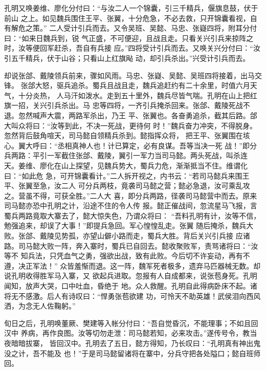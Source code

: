 孔明又唤姜维、廖化分付曰：“与汝二人一个锦囊，引三千精兵，偃旗息鼓，伏于前山
之上。如见魏兵围住王平、张翼，十分危急，不必去救，只开锦囊看视，自有解危之策。”
二人受计引兵而去。又令吴班、吴懿、马忠、张嶷四将，附耳分付曰：“如来日魏兵到，锐
气正盛，不可便迎，且战且走。只看关兴引兵来掠阵之时，汝等便回军赶杀，吾自有兵接
应。”四将受计引兵而去。又唤关兴分付曰：“汝引五千精兵，伏于山谷；只看山上红旗飐
动，却引兵杀出。”兴受计引兵而去。

却说张郃、戴陵领兵前来，骤如风雨。马忠、张嶷、吴懿、吴班四将接着，出马交锋。
张郃大怒，驱兵追杀。蜀兵且战且走，魏兵追赶约有二十余里，时值六月天气，十分炎热，
人马汗如泼水。走到五十里外，魏兵尽皆气喘。孔明在山上把红旗一招，关兴引兵杀出。马
忠等四将，一齐引兵掩杀回来。张郃、戴陵死战不退。忽然喊声大震，两路军杀出，乃王
平、张翼也。各奋勇追杀，截其后路。郃大叫众将曰：“汝等到此，不决一死战，更待何
时！”魏兵奋力冲突，不得脱身。忽然背后鼓角喧天，司马懿自领精兵杀到。懿指挥众将，
把王平、张翼围在垓心。翼大呼曰：“丞相真神人也！计已算定，必有良谋。吾等当决一死
战！”即分兵两路：平引一军截住张郃、戴陵，翼引一军力当司马懿。两头死战，叫杀连
天。姜维、廖化在山上探望，见魏兵势大，蜀兵力危，渐渐抵当不住。维谓化曰：“如此危
急，可开锦囊看计。”二人拆开视之，内书云：“若司马懿兵来围王平、张翼至急，汝二人
可分兵两枝，竟袭司马懿之营；懿必急退，汝可乘乱攻之。营虽不得，可获全胜。”二人大
喜，即分兵两路，径袭司马懿营中而去。原来司马懿亦恐中孔明之计，沿途不住的令人传
报。懿正催战间，忽流星马飞报，言蜀兵两路竟取大寨去了，懿大惊失色，乃谓众将曰：
“吾料孔明有计，汝等不信，勉强追来，却误了大事！”即提兵急回。军心惶惶乱走。张翼
随后掩杀，魏兵大败。张郃、戴陵见势孤，亦望山僻小路而走，蜀兵大胜。背后关兴引兵接
应诸路。司马懿大败一阵，奔入寨时，蜀兵已自回去。懿收聚败军，责骂诸将曰：“汝等不
知兵法，只凭血气之勇，强欲出战，致有此败。今后切不许妄动，再有不遵，决正军法！”
众皆羞惭而退。这一阵，魏军死者极多，遗弃马匹器械无数。却说孔明收得胜军马入寨，又
欲起兵进取。忽报有人自成都来，说张苞身死。孔明闻知，放声大哭，口中吐血，昏绝于
地。众人救醒。孔明自此得病卧床不起。诸将无不感激。后人有诗叹曰：“悍勇张苞欲建
功，可怜天不助英雄！武侯泪向西风洒，为念无人佐鞠躬。”

旬日之后，孔明唤董厥、樊建等入帐分付曰：“吾自觉昏沉，不能理事；不如且回汉中
养病，再作良图。汝等切勿走泄：司马懿若知，必来攻击。”遂传号令，教当夜暗暗拔寨，
皆回汉中。孔明去了五日，懿方得知，乃长叹曰：“孔明真有神出鬼没之计，吾不能及
也！”于是司马懿留诸将在寨中，分兵守把各处隘口；懿自班师回。

